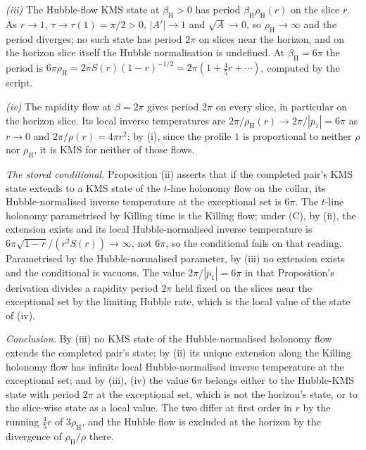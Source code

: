 \emph{(iii)} The Hubble-flow KMS state at $\beta_{\mathrm{H}} > 0$ has period $\beta_{\mathrm{H}}\rho_{\mathrm{H}}(r)$ on the slice $r$. As $r \to 1$, $\tau \to \tau(1) = \pi/2 > 0$, $|A'| \to 1$ and $\sqrt{A} \to 0$, so $\rho_{\mathrm{H}} \to \infty$ and the period diverges; no such state has period $2\pi$ on slices near the horizon, and on the horizon slice itself the Hubble normalisation is undefined. At $\beta_{\mathrm{H}} = 6\pi$ the period is $6\pi\rho_{\mathrm{H}} = 2\pi S(r)(1-r)^{-1/2} = 2\pi(1 + \tfrac45 r + \cdots)$, computed by the script.

\emph{(iv)} The rapidity flow at $\beta = 2\pi$ gives period $2\pi$ on every slice, in particular on the horizon slice. Its local inverse temperatures are $2\pi/\rho_{\mathrm{H}}(r) \to 2\pi/|p_{1}| = 6\pi$ as $r \to 0$ and $2\pi/\rho(r) = 4\pi r^{2}$; by (i), since the profile $1$ is proportional to neither $\rho$ nor $\rho_{\mathrm{H}}$, it is KMS for neither of those flows.

\emph{The stored conditional.} Proposition (ii) asserts that if the completed pair's KMS state extends to a KMS state of the $t$-line holonomy flow on the collar, its Hubble-normalised inverse temperature at the exceptional set is $6\pi$. The $t$-line holonomy parametrised by Killing time is the Killing flow; under (C), by (ii), the extension exists and its local Hubble-normalised inverse temperature is $6\pi\sqrt{1-r}/(r^{2}S(r)) \to \infty$, not $6\pi$, so the conditional fails on that reading. Parametrised by the Hubble-normalised parameter, by (iii) no extension exists and the conditional is vacuous. The value $2\pi/|p_{1}| = 6\pi$ in that Proposition's derivation divides a rapidity period $2\pi$ held fixed on the slices near the exceptional set by the limiting Hubble rate, which is the local value of the state of (iv).

\emph{Conclusion.} By (iii) no KMS state of the Hubble-normalised holonomy flow extends the completed pair's state; by (ii) its unique extension along the Killing holonomy flow has infinite local Hubble-normalised inverse temperature at the exceptional set; and by (iii), (iv) the value $6\pi$ belongs either to the Hubble-KMS state with period $2\pi$ at the exceptional set, which is not the horizon's state, or to the slice-wise state as a local value. The two differ at first order in $r$ by the running $\tfrac45 r$ of $3\rho_{\mathrm{H}}$, and the Hubble flow is excluded at the horizon by the divergence of $\rho_{\mathrm{H}}/\rho$ there.
